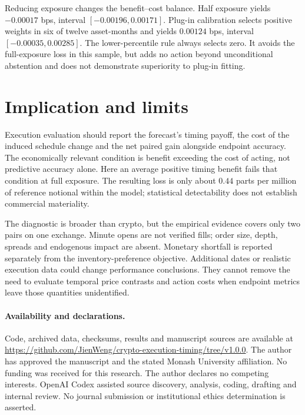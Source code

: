 \documentclass[11pt]{article}
\begin{document}
Reducing exposure changes the benefit--cost balance. Half exposure yields $-0.00017$ bps, interval $[-0.00196,0.00171]$. Plug-in calibration selects positive weights in six of twelve asset-months and yields $0.00124$ bps, interval $[-0.00035,0.00285]$. The lower-percentile rule always selects zero. It avoids the full-exposure loss in this sample, but adds no action beyond unconditional abstention and does not demonstrate superiority to plug-in fitting.

\section{Implication and limits}
Execution evaluation should report the forecast's timing payoff, the cost of the induced schedule change and the net paired gain alongside endpoint accuracy. The economically relevant condition is benefit exceeding the cost of acting, not predictive accuracy alone. Here an average positive timing benefit fails that condition at full exposure. The resulting loss is only about $0.44$ parts per million of reference notional within the model; statistical detectability does not establish commercial materiality.

The diagnostic is broader than crypto, but the empirical evidence covers only two pairs on one exchange. Minute opens are not verified fills; order size, depth, spreads and endogenous impact are absent. Monetary shortfall is reported separately from the inventory-preference objective. Additional dates or realistic execution data could change performance conclusions. They cannot remove the need to evaluate temporal price contrasts and action costs when endpoint metrics leave those quantities unidentified.

\paragraph{Availability and declarations.}
Code, archived data, checksums, results and manuscript sources are available at \url{https://github.com/JienWeng/crypto-execution-timing/tree/v1.0.0}. The author has approved the manuscript and the stated Monash University affiliation. No funding was received for this research. The author declares no competing interests. OpenAI Codex assisted source discovery, analysis, coding, drafting and internal review. No journal submission or institutional ethics determination is asserted.



\end{document}
